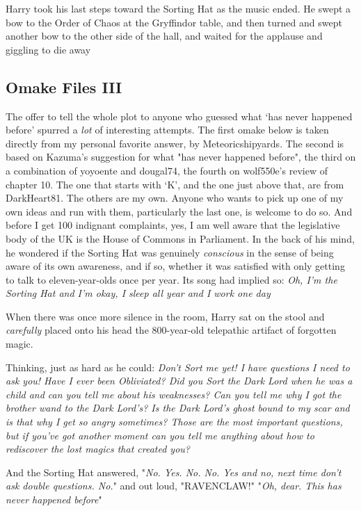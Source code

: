 Harry took his last steps toward the Sorting Hat as the music ended. He swept a
bow to the Order of Chaos at the Gryffindor table, and then turned and swept
another bow to the other side of the hall, and waited for the applause and
giggling to die away{\el}
\sbreak
\vspace{-2\baselineskip}
\subsection{Omake Files III}
The offer to tell the whole plot to anyone who guessed what `has never happened
before' spurred a \emph{lot} of interesting attempts. The first omake below is
taken directly from my personal favorite answer, by Meteoricshipyards. The
second is based on Kazuma's suggestion for what "has never happened before",
the third on a combination of yoyoente and dougal74, the fourth on wolf550e's
review of chapter 10. The one that starts with `K', and the one just above
that, are from DarkHeart81. The others are my own. Anyone who wants to pick up
one of my own ideas and run with them, particularly the last one, is welcome to
do so. And before I get 100 indignant complaints, yes, I am well aware that the
legislative body of the UK is the House of Commons in Parliament.
\sbreak
{\el}In the back of his mind, he wondered if the Sorting Hat was genuinely
\emph{conscious} in the sense of being aware of its own awareness, and if so,
whether it was satisfied with only getting to talk to eleven-year-olds once per
year. Its song had implied so: \emph{Oh, I'm the Sorting Hat and I'm okay, I
sleep all year and I work one day{\el}}

When there was once more silence in the room, Harry sat on the stool and
\emph{carefully} placed onto his head the 800-year-old telepathic artifact of
forgotten magic.

Thinking, just as hard as he could: \emph{Don't Sort me yet! I have questions I
need to ask you! Have I ever been Obliviated? Did you Sort the Dark Lord when
he was a child and can you tell me about his weaknesses? Can you tell me why I
got the brother wand to the Dark Lord's? Is the Dark Lord's ghost bound to my
scar and is that why I get so angry sometimes? Those are the most important
questions, but if you've got another moment can you tell me anything about how
to rediscover the lost magics that created you?}

And the Sorting Hat answered, "\emph{No. Yes. No. No. Yes and no, next time
don't ask double questions. No.}" and out loud, "RAVENCLAW!"
\sbreak
"\emph{Oh, dear. This has never happened before{\el}}"

